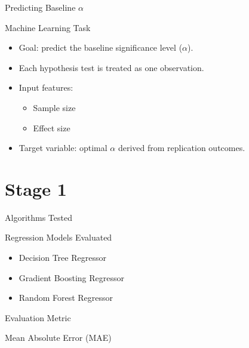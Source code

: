 \begin{frame}{Predicting Baseline $\alpha$}
	
	\begin{block}{Machine Learning Task}
		
		\begin{itemize}
			\item Goal: predict the baseline significance level ($\alpha$).
			\item Each hypothesis test is treated as one observation.
			\item Input features:
			\begin{itemize}
				\item Sample size
				\item Effect size
			\end{itemize}
			\item Target variable: optimal $\alpha$ derived from replication outcomes.
		\end{itemize}
		
	\end{block}
	
\end{frame}

\section{Stage 1}
\begin{frame}{Algorithms Tested}
	
	\begin{block}{Regression Models Evaluated}
		
		\begin{itemize}
			\item Decision Tree Regressor
			\item Gradient Boosting Regressor
			\item Random Forest Regressor
		\end{itemize}
		
	\end{block}
	
	\vspace{0.4cm}
	
	\begin{exampleblock}{Evaluation Metric}
		
		Mean Absolute Error (MAE)
		
	\end{exampleblock}
	
\end{frame}

